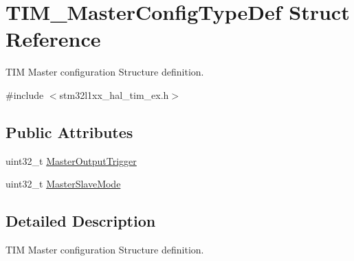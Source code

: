 \hypertarget{struct_t_i_m___master_config_type_def}{\section{T\-I\-M\-\_\-\-Master\-Config\-Type\-Def Struct Reference}
\label{struct_t_i_m___master_config_type_def}
}


T\-I\-M Master configuration Structure definition.  




{\ttfamily \#include $<$stm32l1xx\-\_\-hal\-\_\-tim\-\_\-ex.\-h$>$}

\subsection*{Public Attributes}
\begin{DoxyCompactItemize}
\item 
uint32\-\_\-t \hyperlink{struct_t_i_m___master_config_type_def_a908a6c1b46cb203c0b8b59b490e1114e}{Master\-Output\-Trigger}
\item 
uint32\-\_\-t \hyperlink{struct_t_i_m___master_config_type_def_a45ddfca310a1180e19fc24b36f8e9585}{Master\-Slave\-Mode}
\end{DoxyCompactItemize}


\subsection{Detailed Description}
T\-I\-M Master configuration Structure definition. 

